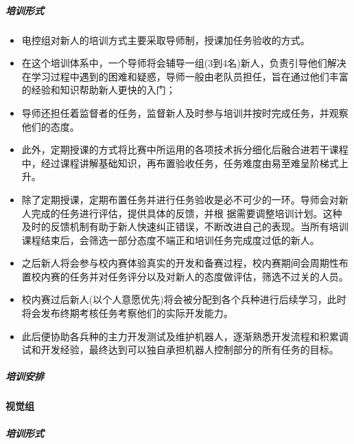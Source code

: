             \subparagraph{培训形式}


                \begin{itemize}
                    \item 电控组对新人的培训方式主要采取导师制，授课加任务验收的方式。
                    \item 在这个培训体系中，一个导师将会辅导一组(3到4名)新人，负责引导他们解决在学习过程中遇到的困难和疑惑，导师一般由老队员担任，旨在通过他们丰富的经验和知识帮助新人更快的入门；
                    \item 导师还担任着监督者的任务，监督新人及时参与培训并按时完成任务，并观察他们的态度。
                    \item 此外，定期授课的方式将比赛中所运用的各项技术拆分细化后融合进若干课程中，经过课程讲解基础知识，再布置验收任务，任务难度由易至难呈阶梯式上升。
                    \item 除了定期授课，定期布置任务并进行任务验收是必不可少的一环。导师会对新人完成的任务进行评估，提供具体的反馈，并根 据需要调整培训计划。这种及时的反馈机制有助于新人快速纠正错误，不断改进自己的表现。当所有培训课程结束后，会筛选一部分态度不端正和培训任务完成度过低的新人。
                    \item 之后新人将会参与校内赛体验真实的开发和备赛过程，校内赛期间会周期性布置校内赛的任务并对任务评分以及对新人的态度做评估，筛选不过关的人员。
                    \item 校内赛过后新人(以个人意愿优先)将会被分配到各个兵种进行后续学习，此时将会发布终期考核任务考察他们的实际开发能力。
                    \item 此后便协助各兵种的主力开发测试及维护机器人，逐渐熟悉开发流程和积累调试和开发经验，最终达到可以独自承担机器人控制部分的所有任务的目标。
                \end{itemize}

            \subparagraph{培训安排}


        \paragraph{视觉组}

            \subparagraph{培训形式}


